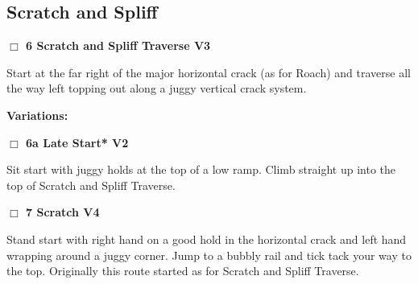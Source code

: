 	\begin{multicols}{2}

\needspace{10em}
\subsection*{Scratch and Spliff}\label{bf:Scratch and Spliff}




\needspace{2em}
\label{rt:Scratch and Spliff Traverse}
\colorbox{green!20}{
\parbox{0.95\linewidth}{
\hspace{-1ex}\textbf{$\Box$
6 Scratch and Spliff Traverse V3  
}}}
\begin{adjustwidth}{1.3em}{}			

Start at the far right of the major horizontal crack (as for Roach) and traverse all the way left topping out along a juggy vertical crack system.
\end{adjustwidth}


\begin{adjustwidth}{0.5cm}{}				
\needspace{4em}
\textbf{Variations:} \newline

\needspace{2em}
\label{vr:Late Start}
\colorbox{green!20}{
\parbox{0.95\linewidth}{
\hspace{-1ex}\textbf{$\Box$
6a Late Start* V2  
}}}
\begin{adjustwidth}{1.3em}{}			

Sit start with juggy holds at the top of a low ramp. Climb straight up into the top of Scratch and Spliff Traverse.
\end{adjustwidth}



\end{adjustwidth}


\needspace{2em}
\label{rt:Scratch}
\colorbox{RoyalBlue!20}{
\parbox{0.95\linewidth}{
\hspace{-1ex}\textbf{$\Box$
7 Scratch V4  
}}}
\begin{adjustwidth}{1.3em}{}			

Stand start with right hand on a good hold in the horizontal crack and left hand wrapping around a juggy corner. Jump to a bubbly rail and tick tack your way to the top. Originally this route started as for Scratch and Spliff Traverse.
\end{adjustwidth}




\end{multicols}
